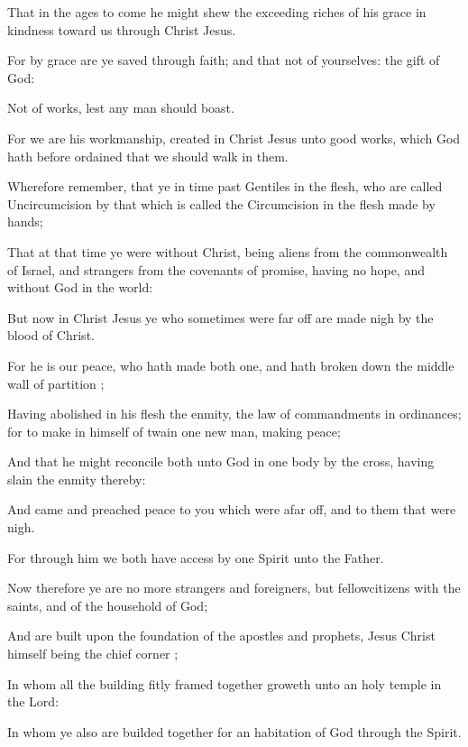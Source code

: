 {That
in the
ages to
come he might
shew the
exceeding
riches of
his
grace
in
{}
kindness
toward
us
through
Christ
Jesus.

For by
grace
are ye
saved
through
faith;
and
that
not
of
yourselves:
{} the
gift of
God:

Not
of
works,
lest any
man should
boast.

For we
are
his
workmanship,
created
in
Christ
Jesus
unto
good
works,
which
God hath before
ordained
that we should
walk
in
them.


\par }{\PP {}Wherefore
remember,
that
ye
{} in time
past
Gentiles
in the
flesh, who
are
called
Uncircumcision
by that which
is
called the
Circumcision
in the
flesh made by
hands;

That
at
that
time ye
were
without
Christ, being
aliens from the
commonwealth of
Israel,
and
strangers from the
covenants of
promise,
having
no
hope,
and without
God
in the
world:

But
now
in
Christ
Jesus
ye
who
sometimes
were far
off are
made
nigh
by the
blood of
Christ.

For
he
is
our
peace,
who hath
made
both
one,
and hath broken
down the middle
wall of
partition
{};

Having
abolished
in
his
flesh the
enmity,
{} the
law of
commandments
{}
in
ordinances;
for
to
make
in
himself of
twain
one
new
man,
{}
making
peace;

And that
he might
reconcile
both unto
God
in
one
body
by the
cross, having
slain the
enmity
thereby:

And
came and
preached
peace to
you which
were afar
off,
and to them that
were
nigh.

For
through
him
we
both
have
access
by
one
Spirit
unto the
Father.

Now
therefore ye
are no
more
strangers
and
foreigners,
but
fellowcitizens with the
saints,
and of the
household of
God;

And are
built
upon the
foundation of the
apostles
and
prophets,
Jesus
Christ
himself
being the chief
corner
{};

In
whom
all the
building fitly framed
together
groweth
unto an
holy
temple
in the
Lord:

In
whom
ye
also are builded
together
for an
habitation of
God
through the
Spirit.




}
